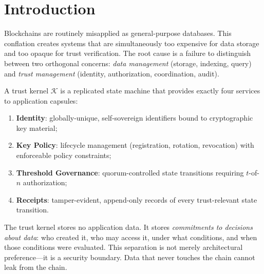 

\section{Introduction}
\label{sec:intro}

Blockchains are routinely misapplied as general-purpose databases. This conflation
creates systems that are simultaneously too expensive for data storage and too
opaque for trust verification. The root cause is a failure to distinguish between
two orthogonal concerns: \emph{data management} (storage, indexing, query) and
\emph{trust management} (identity, authorization, coordination, audit).

\begin{definition}\label{def:trust-kernel}
A trust kernel $\mathcal{K}$ is a replicated state machine that provides exactly
four services to application capsules:
\begin{enumerate}[label=(\alph*)]
    \item \textbf{Identity}: globally-unique, self-sovereign identifiers bound to
          cryptographic key material;
    \item \textbf{Key Policy}: lifecycle management (registration, rotation,
          revocation) with enforceable policy constraints;
    \item \textbf{Threshold Governance}: quorum-controlled state transitions
          requiring $t$-of-$n$ authorization;
    \item \textbf{Receipts}: tamper-evident, append-only records of every
          trust-relevant state transition.
\end{enumerate}
\end{definition}

The trust kernel stores no application data. It stores \emph{commitments to decisions
about data}: who created it, who may access it, under what conditions, and when those
conditions were evaluated. This separation is not merely architectural preference---it
is a security boundary. Data that never touches the chain cannot leak from the chain.

